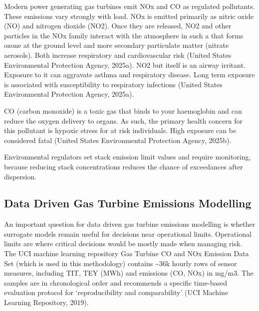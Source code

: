 \documentclass[11pt]{article}
\begin{document}
Modern power generating gas turbines emit NOx and CO as regulated
pollutants. These emissions vary strongly with load. NOx is emitted
primarily as nitric oxide (NO) and nitrogen dioxide (NO2). Once they are
released, NO2 and other particles in the NOx family interact with the
atmosphere in such a that forms ozone at the ground level and more
secondary particulate matter (nitrate aerosols). Both increase
respiratory and cardiovascular risk (United States Environmental
Protection Agency, 2025a). NO2 but itself is an airway irritant.
Exposure to it can aggravate asthma and respiratory disease. Long term
exposure is associated with susceptibility to respiratory infections
(United States Environmental Protection Agency, 2025a).

CO (carbon monoxide) is a toxic gas that binds to your haemoglobin and
can reduce the oxygen delivery to organs. As such, the primary health
concern for this pollutant is hypoxic stress for at risk individuals.
High exposure can be considered fatal (United States Environmental
Protection Agency, 2025b).

Environmental regulators set stack emission limit values and require
monitoring, because reducing stack concentrations reduces the chance of
exceedances after dispersion.

\subsection{}\label{section-4}

\subsection{Data Driven Gas Turbine Emissions
Modelling}\label{data-driven-gas-turbine-emissions-modelling}

An important question for data driven gas turbine emissions modelling is
whether surrogate models remain useful for decisions near operational
limits. Operational limits are where critical decisions would be mostly
made when managing risk. The UCI machine learning repository Gas Turbine
CO and NOx Emission Data Set (which is used in this methodology)
contains \textasciitilde36k hourly rows of sensor measures, including
TIT, TEY (MWh) and emissions (CO, NOx) in mg/m3. The samples are in
chronological order and recommends a specific time-based evaluation
protocol for `reproducibility and comparability' (UCI Machine Learning
Repository, 2019).
\end{document}
